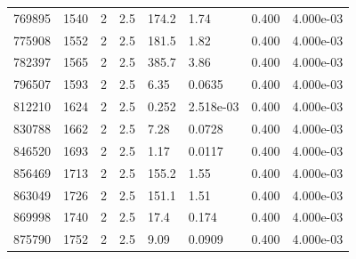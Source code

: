 \documentclass[preview]{standalone}
\begin{document}
{{{{{{{{{{{{{{{{{\begin{tabular}{L{1.2cm}C{1.2cm} C{0.3cm}C{0.5cm} C{1.4cm}C{1.4cm} C{1.4cm}C{1.4cm}}
  769895  &  1540  & 2     & 2.5 &  174.2  & 1.74  & 0.400 &  4.000e-03   \\ 
  775908  &  1552  & 2     & 2.5 &  181.5  & 1.82  & 0.400 &  4.000e-03   \\ 
  782397  &  1565  & 2     & 2.5 &  385.7  & 3.86  & 0.400 &  4.000e-03   \\ 
  796507  &  1593  & 2     & 2.5 &  6.35  & 0.0635  & 0.400 &  4.000e-03   \\ 
  812210  &  1624  & 2     & 2.5 &  0.252  & 2.518e-03  & 0.400 &  4.000e-03   \\ 
  830788  &  1662  & 2     & 2.5 &  7.28  & 0.0728  & 0.400 &  4.000e-03   \\ 
  846520  &  1693  & 2     & 2.5 &  1.17  & 0.0117  & 0.400 &  4.000e-03   \\ 
  856469  &  1713  & 2     & 2.5 &  155.2  & 1.55  & 0.400 &  4.000e-03   \\ 
  863049  &  1726  & 2     & 2.5 &  151.1  & 1.51  & 0.400 &  4.000e-03   \\ 
  869998  &  1740  & 2     & 2.5 &  17.4  & 0.174  & 0.400 &  4.000e-03   \\ 
  875790  &  1752  & 2     & 2.5 &  9.09  & 0.0909  & 0.400 &  4.000e-03   \\ 
\hline 
\end{tabular} 

}}}}}}}}}}}}}}}}}
\end{document}
